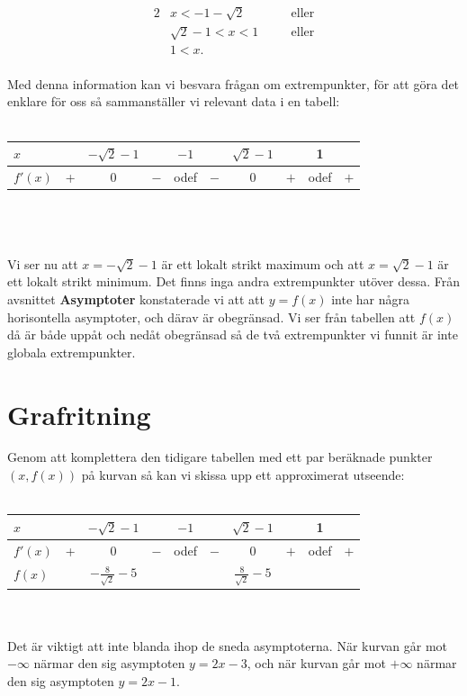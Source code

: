 \documentclass{article}
\begin{document}
\begin{alignat*}{2}
  & x < -1 - \sqrt{2} &&\quad\text{eller}\\
  & \sqrt{2} - 1 < x < 1 &&\quad\text{eller} \\
  & 1 < x\text{.} &&
\end{alignat*}
\\
Med denna information kan vi besvara frågan om extrempunkter, för att göra det enklare för oss så sammanställer vi relevant data i en tabell:
\\
\\
\begin{tabular}[c]{l | c | c | c | c | c | c | c | c | c}
  $x$     &   & $-\sqrt{2} - 1$ &     & $-1$ &     & $\sqrt{2} - 1$ &     & 1    &     \\ \hline
  $f'(x)$ & + & $0$             & $-$ & odef & $-$ & $0$            & $+$ & odef & $+$ \\
\end{tabular}
\\
\\
\\
Vi ser nu att $x = -\sqrt{2} - 1$ är ett lokalt strikt maximum och att $x = \sqrt{2} - 1$ är ett lokalt strikt minimum. Det finns inga andra extrempunkter utöver dessa. Från avsnittet \textbf{Asymptoter} konstaterade vi att att $y = f(x)$ inte har några horisontella asymptoter, och därav är obegränsad. Vi ser från tabellen att $f(x)$ då är både uppåt och nedåt obegränsad så de två extrempunkter vi funnit är inte globala extrempunkter.

\section*{Grafritning}

Genom att komplettera den tidigare tabellen med ett par beräknade punkter $(x, f(x))$ på kurvan så kan vi skissa upp ett approximerat utseende:
\\
\\
\begin{tabular}[c]{l | c | c | c | c | c | c | c | c | c}
  $x$     &   & $-\sqrt{2} - 1$ &     & $-1$ &     & $\sqrt{2} - 1$ &     & 1    &     \\ \hline
  $f'(x)$ & + & $0$             & $-$ & odef & $-$ & $0$            & $+$ & odef & $+$ \\
  $f(x)$  &   & $-\tfrac{8}{\sqrt{2}} - 5$ &&&     & $\tfrac{8}{\sqrt{2}} - 5$ &&&
\end{tabular}
\\
\\
Det är viktigt att inte blanda ihop de sneda asymptoterna. När kurvan går mot $-\infty$ närmar den sig asymptoten $y = 2x - 3$, och när kurvan går mot $+\infty$ närmar den sig asymptoten $y = 2x - 1$.
\end{document}
